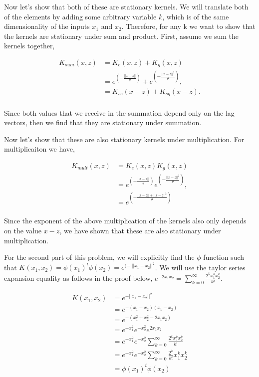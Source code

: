 \documentclass[paper=a4, fontsize=11pt]{scrartcl} %
\begin{document}
Now let's show that both of these are stationary kernels.  We will translate both of the elements by adding some arbitrary variable $k$, which is of the same dimensionality of the inputs $x_1$ and $x_2$.  Therefore, for any k we want to show that the kernels are stationary under sum and product.  First, assume we sum the kernels together,

\begin{align}
K_{sum}(x,z) &= K_e(x,z)+K_g(x,z) \\
&= e^{(-\frac{||x-z||}{\theta})} + e^{(-\frac{||x-z||^2}{\theta})}, \\
&= K_{se}(x-z) + K_{sg}(x-z). \\
\end{align}

Since both values that we receive in the summation depend only on the lag vectors, then we find that they are stationary under summation.

Now let's show that these are also stationary kernels under multiplication.  For multiplicaiton we have,

\begin{align}
K_{mult}(x,z) &= K_e(x,z)K_g(x,z) \\
&= e^{(-\frac{||x-z||}{\theta})}e^{(-\frac{||x-z||^2}{\theta})}, \\
&=  e^{(-\frac{||x-z||+||x-z||^2}{\theta})}\\
\end{align}

Since the exponent of the above multiplication of the kernels also only depends on the value $x-z$, we have shown that these are also stationary under multiplication.

For the second part of this problem, we will explicitly find the $\phi$ function such that $K(x_1,x_2) = \phi(x_1)^t\phi(x_2) =  e^{(-|||x_1-x_2||^2}$.  We will use the taylor series expansion equality as follows in the proof below, $e^{-2x_1x_2} = \sum \limits_{k=0}^\infty \frac{2^kx_1^kx_2^k}{k!}$. 

\begin{align}
K(x_1,x_2) &= e^{-||x_1-x_2||^2} \\
&= e^{-(x_1-x_2)(x_1-x_2)}\\
&= e^{-(x_1^{2} + x_2^{2} - 2x_1x_2)} \\
&= e^{-x_1^{2}}e^{-x_2^{2}}e^{2x_1x_2} \\
&= e^{-x_1^{2}}e^{-x_2^{2}} \sum \limits_{k=0}^\infty \frac{2^kx_1^kx_2^k}{k!} \\
&= e^{-x_1^{2}}e^{-x_2^{2}}\sum \limits_{k=0}^\infty \frac{2^{k}}{k!}x_1^kx_2^k \\
&= \phi(x_1)^t\phi(x_2)
\end{align}
\end{document}
